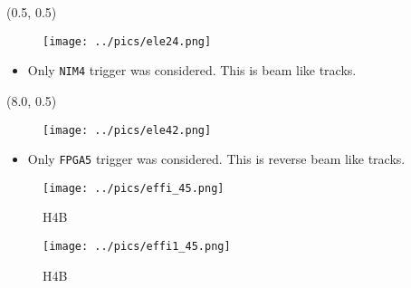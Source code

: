 \documentclass[10pt, xcolor={dvipsnames}, aspectratio = 169]{beamer}
\begin{document}
\begin{frame}[fragile]

\begin{textblock}{7.0}(0.5, 0.5)
\begin{figure}
\centering
\texttt{[image: ../pics/ele24.png]}
\end{figure}

\begin{itemize}
	\item Only \verb|NIM4| trigger was considered. This is beam like tracks. 
\end{itemize}

\end{textblock}

\begin{textblock}{7.0}(8.0, 0.5)
\begin{figure}
\centering
\texttt{[image: ../pics/ele42.png]}
\end{figure}

\begin{itemize}
	\item Only \verb|FPGA5| trigger was considered. This is reverse beam like tracks. 
\end{itemize}

\end{textblock}



\end{frame}


\begin{frame}

\begin{figure}
\centering
\texttt{[image: ../pics/effi\_45.png]}
\caption{H4B}
\end{figure}

\end{frame}


\begin{frame}

\begin{figure}
\centering
\texttt{[image: ../pics/effi1\_45.png]}
\caption{H4B}
\end{figure}

\end{frame}
\end{document}
